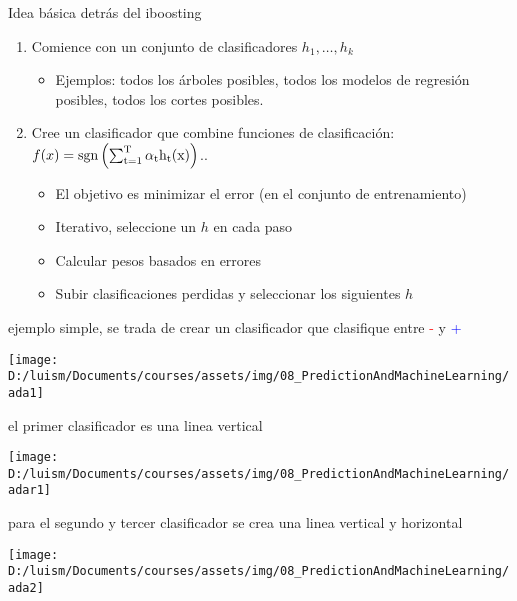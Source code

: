 \documentclass[
]{article}
\providecommand{\tightlist}{%
  \setlength{\itemsep}{0pt}\setlength{\parskip}{0pt}}
\begin{document}
Idea básica detrás del iboosting

\begin{enumerate}
\def\labelenumi{\arabic{enumi}.}
\tightlist
\item
  Comience con un conjunto de clasificadores \(h_1, \ldots, h_k\)

  \begin{itemize}
  \tightlist
  \item
    Ejemplos: todos los árboles posibles, todos los modelos de regresión
    posibles, todos los cortes posibles.
  \end{itemize}
\item
  Cree un clasificador que combine funciones de clasificación:
  \(f(x) = \rm{sgn}\left(\sum_{t=1}^T \alpha_t h_t(x)\right)\)..

  \begin{itemize}
  \tightlist
  \item
    El objetivo es minimizar el error (en el conjunto de entrenamiento)
  \item
    Iterativo, seleccione un \(h\) en cada paso
  \item
    Calcular pesos basados en errores
  \item
    Subir clasificaciones perdidas y seleccionar los siguientes \(h\)
  \end{itemize}
\end{enumerate}

ejemplo simple, se trada de crear un clasificador que clasifique entre
\textcolor{red}{-} y \textcolor{blue}{+}

\begin{center}\texttt{[image: D:/luism/Documents/courses/assets/img/08\_PredictionAndMachineLearning/ada1]} \end{center}

el primer clasificador es una linea vertical

\begin{center}\texttt{[image: D:/luism/Documents/courses/assets/img/08\_PredictionAndMachineLearning/adar1]} \end{center}

para el segundo y tercer clasificador se crea una linea vertical y
horizontal

\begin{center}\texttt{[image: D:/luism/Documents/courses/assets/img/08\_PredictionAndMachineLearning/ada2]} \end{center}
\end{document}
